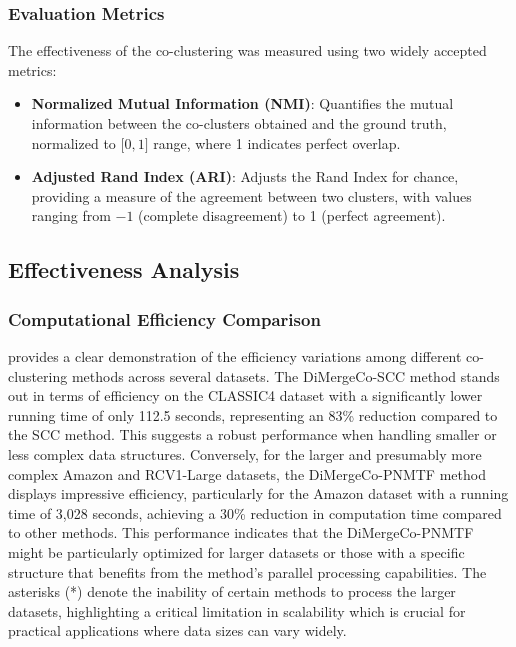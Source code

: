 \documentclass[journal]{IEEEtran}
\theoremstyle{definition}
\theoremstyle{remark} %
\begin{document}
\subsubsection{Evaluation Metrics}
The effectiveness of the co-clustering was measured using two widely accepted metrics:
\begin{itemize}
    \item \textbf{Normalized Mutual Information (NMI)}: Quantifies the mutual information between the co-clusters obtained and the ground truth, normalized to \(\lbrack 0,1 \rbrack \) range, where 1 indicates perfect overlap.
    \item \textbf{Adjusted Rand Index (ARI)}: Adjusts the Rand Index for chance, providing a measure of the agreement between two clusters, with values ranging from $-1$ (complete disagreement) to 1 (perfect agreement).
\end{itemize}


\subsection{Effectiveness Analysis}
\subsubsection{Computational Efficiency Comparison}
 provides a clear demonstration of the efficiency variations among different co-clustering methods across several datasets. The DiMergeCo-SCC method stands out in terms of efficiency on the CLASSIC4 dataset with a significantly lower running time of only 112.5 seconds, representing an 83\% reduction compared to the SCC method. This suggests a robust performance when handling smaller or less complex data structures. Conversely, for the larger and presumably more complex Amazon and RCV1-Large datasets, the DiMergeCo-PNMTF method displays impressive efficiency, particularly for the Amazon dataset with a running time of 3,028 seconds, achieving a 30\% reduction in computation time compared to other methods. This performance indicates that the DiMergeCo-PNMTF might be particularly optimized for larger datasets or those with a specific structure that benefits from the method's parallel processing capabilities. The asterisks (*) denote the inability of certain methods to process the larger datasets, highlighting a critical limitation in scalability which is crucial for practical applications where data sizes can vary widely.
\end{document}
